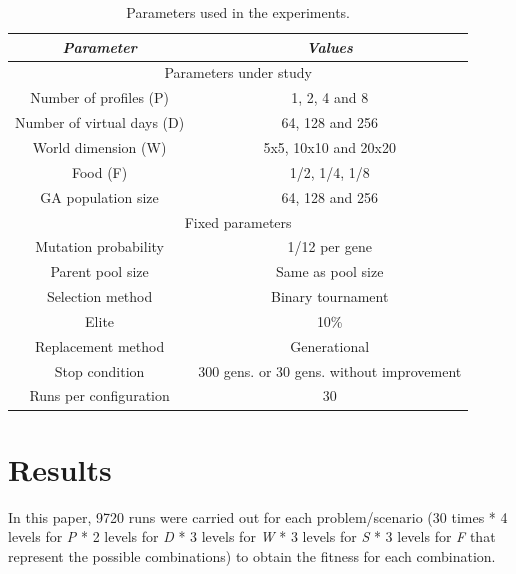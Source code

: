 \documentclass[runningheads,a4paper]{llncs}
\begin{document}
\begin{table}
\begin{center}
\begin{tabular}{|c|c|}
\hline
{\em Parameter} & {\em Values} \\\hline \hline
\multicolumn{2}{|c|}{Parameters under study} \\ \hline \hline
Number of profiles (P) & 1, 2, 4 and 8 \\\hline
Number of virtual days (D) &  64, 128 and 256 \\ \hline
World dimension (W) &  5x5, 10x10 and 20x20 \\ \hline
Food (F) & 1/2, 1/4, 1/8 \\ \hline
GA population size & 64, 128 and 256 \\ \hline
\multicolumn{2}{|c|}{Fixed parameters} \\ \hline \hline
Mutation probability & 1/12 per gene \\ \hline
Parent pool size & Same as pool size \\ \hline
Selection method & Binary tournament \\ \hline 
Elite & 10\%  \\ \hline
Replacement method & Generational\\ \hline
Stop condition & 300 gens. or 30 gens. without improvement \\ \hline
Runs per configuration & 30 \\ \hline
\end{tabular}
\caption{Parameters used in the experiments.}
\label{tab:parameters}
\end{center}
\end{table}


\section{Results}
\label{sec:res}

In this paper, 9720 runs were carried out for each problem/scenario (30 times * 4 levels for \emph{P} * 2 levels for \emph{D} * 3 levels for \emph{W} * 3 levels for \emph{S} * 3 levels for \emph{F} that represent the possible combinations) to obtain the fitness for each combination.
\end{document}
